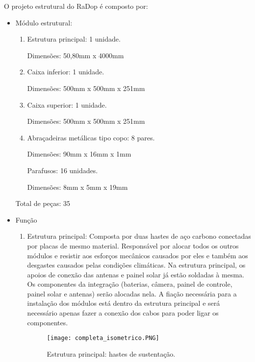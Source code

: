         O projeto estrutural do RaDop é composto por:
        \begin{itemize}
        
        
            \item Módulo estrutural:
                   \begin{enumerate}
                \item Estrutura principal: 1 unidade.
                
                Dimensões: 50,80mm x 4000mm 
                
                \item Caixa inferior: 1 unidade.
                
                Dimensões: 500mm x 500mm x 251mm
                
                \item Caixa superior: 1 unidade.

                Dimensões: 500mm x 500mm x 251mm
                
                \item Abraçadeiras metálicas tipo copo: 8 pares.

                Dimensões: 90mm x 16mm x 1mm
                
                Parafusos: 16 unidades.
                
                Dimensões: 8mm x 5mm x 19mm
                \end{enumerate}
                Total de peças: 35
                
            \item Função
            \begin{enumerate}
                \item Estrutura principal: Composta por duas hastes de aço carbono conectadas por placas de mesmo material. Responsável por alocar todos os outros módulos e resistir aos esforços mecânicos causados por eles e também aos desgastes causados pelas condições climáticas. 
                Na estrutura principal, os apoios de conexão das antenas e painel solar já estão soldadas à mesma. Os componentes da integração (baterias, câmera, painel de controle, painel solar e antenas) serão alocadas nela.
                A fiação necessária para a instalação dos módulos está dentro da estrutura principal e será necessário apenas fazer a conexão dos cabos para poder ligar os componentes.
        
        \begin{figure}[H]
            \centering
            \texttt{[image: completa\_isometrico.PNG]}
            \caption{Estrutura principal: hastes de sustentação.}
            \label{fig:my_label}
        \end{figure}
                

\end{enumerate}
\end{itemize}
